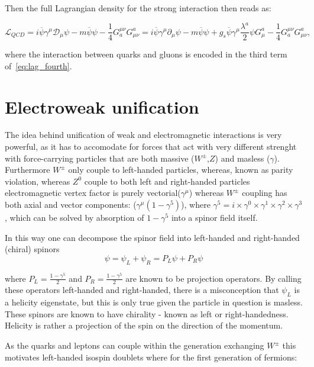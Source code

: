 Then the full Lagrangian density for the strong interaction then reads as:

\begin{equation}
	\mathcal{L}_{QCD} = i\overline{\psi}\gamma^{\mu}\mathcal{D}_{\mu}\psi - m\overline{\psi}\psi -\frac{1}{4} G_{a}^{\mu\nu}G^{a}_{\mu\nu} = i\overline{\psi}\gamma^{\mu}\partial_{\mu}\psi - m\overline{\psi}\psi + g_{s}\overline{\psi}\gamma^{\mu}\frac{\lambda^{a}}{2}\psi G^{a}_{\mu} -\frac{1}{4} G_{a}^{\mu\nu}G^{a}_{\mu\nu},
\label{eq:lag_fourth}
\end{equation}

where the interaction between quarks and gluons is encoded in the third term of~\autoref{eq:lag_fourth}.


\section{Electroweak unification}
The idea behind unification of weak and electromagnetic interactions is very powerful, as it has to accomodate for forces that act with very different strenght with force-carrying particles that are both massive ($W^{\pm}$,$Z$) and masless ($\gamma$). Furthermore $W^{\pm}$ only couple to left-handed particles, whereas, known as parity violation, whereas $Z^{0}$ couple to both left and right-handed particles  electromagnetic vertex factor is purely vectorial($\gamma^{\mu}$) whereas $W^{\pm}$ coupling has both axial and vector components: ($\gamma^{\mu}(1-\gamma^{5})$), where $\gamma^{5}=i\times\gamma^{0}\times\gamma^{1}\times\gamma^{2}\times\gamma^{3}$, which can be solved by absorption of $1-\gamma^{5}$ into a spinor field itself.

In this way one can decompose the spinor field into left-handed and right-handed (chiral) spinors
\begin{equation}
	\psi=\psi_{L}+\psi_{R} = P_{L}\psi + P_{R}\psi
\end{equation}

where $P_{L} =\frac{1-\gamma^{5}}{2}$ and $P_{R}=\frac{1-\gamma^{5}}{2}$ are known to be projection operators. By calling these operators left-handed and right-handed, there is a misconception that $\psi_{L}$ is a helicity eigenstate, but this is only true given the particle in question is masless. These spinors are known to have chirality - known as left or right-handedness. Helicity is rather a projection of the spin on the direction of the momentum.

As the quarks and leptons can couple within the generation exchanging $W^{\pm}$ this motivates left-handed isospin doublets where for the first generation of fermions:

